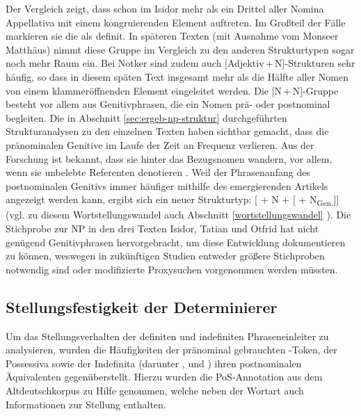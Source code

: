 Der Vergleich zeigt, dass schon im Isidor mehr als ein Drittel aller Nomina Appellativa  mit einem kongruierenden Element auftreten. Im Großteil der Fälle markieren sie die  als definit. In späteren Texten (mit Ausnahme vom Monseer Matthäus) nimmt diese Gruppe im Vergleich zu den anderen Strukturtypen sogar noch mehr Raum ein. Bei Notker sind zudem auch  [Adjektiv\,+\,N]-Strukturen sehr häufig, so dass in diesem späten Text insgesamt mehr als die Hälfte aller Nomen von einem  klammeröffnenden  Element eingeleitet werden. Die [N\,+\,N]-Gruppe besteht vor allem aus  Genitivphrasen, die ein Nomen prä- oder postnominal begleiten. Die in Abschnitt \ref{sec:ergeb-np-struktur} durchgeführten Strukturanalysen zu den einzelnen Texten haben sichtbar gemacht, dass die pränominalen Genitive im Laufe der Zeit an Frequenz verlieren. Aus der Forschung ist bekannt, dass sie hinter das Bezugsnomen wandern, vor allem, wenn sie unbelebte Referenten denotieren \parencite{Demske2001}. Weil der Phrasenanfang des postnominalen Genitivs  immer häufiger mithilfe des emergierenden Artikels angezeigt werden kann, ergibt sich ein neuer Strukturtyp: [ + N + [ + N\textsubscript{Gen.}]] (vgl. zu diesem Wortstellungswandel  auch Abschnitt \ref{wortstellungswandel} ). Die Stichprobe zur NP in den drei Texten Isidor, Tatian und Otfrid hat nicht genügend Genitivphrasen hervorgebracht, um diese Entwicklung dokumentieren zu können, weswegen in zukünftigen Studien entweder größere Stichproben notwendig sind oder modifizierte Proxysuchen  vorgenommen werden müssten.   


\subsection{Stellungsfestigkeit der Determinierer} \label{sec:ergebnisse-stellung}

Um das Stellungsverhalten der definiten und indefiniten Phraseneinleiter zu analysieren, wurden die Häufigkeiten der pränominal  gebrauchten -Token, der Possessiva  sowie der Indefinita  (darunter ,  und ) ihren postnominalen Äquivalenten gegenüberstellt. Hierzu wurden die PoS-Annotation  aus dem Altdeutschkorpus  zu Hilfe genommen, welche neben der Wortart auch Informationen zur Stellung enthalten. 

